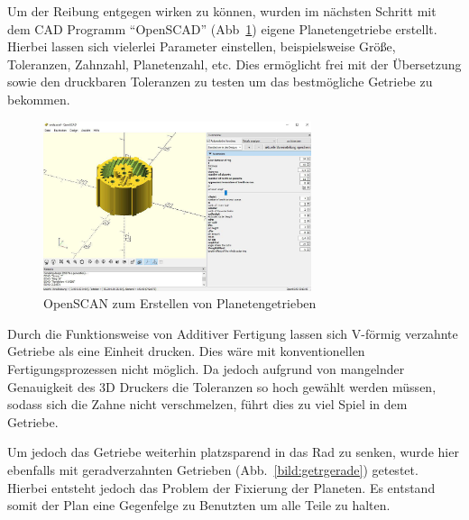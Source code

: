 Um der Reibung entgegen wirken zu können, wurden im nächsten Schritt mit dem CAD Programm ``OpenSCAD'' (Abb~\ref{bild:gearversion2}) eigene Planetengetriebe erstellt.
Hierbei lassen sich vielerlei Parameter einstellen, beispielsweise Größe, Toleranzen, Zahnzahl, Planetenzahl, etc.
Dies ermöglicht frei mit der Übersetzung sowie den druckbaren Toleranzen zu testen um das bestmögliche Getriebe zu bekommen.
\begin{figure}[H]
	\centering
	\includegraphics[width=0.7\textwidth]{bilder/GetriebeVersion2.jpg}
	\caption{OpenSCAN zum Erstellen von Planetengetrieben}
	\label{bild:gearversion2}
\end{figure}

Durch die Funktionsweise von Additiver Fertigung lassen sich V-förmig verzahnte Getriebe als eine Einheit drucken.
Dies wäre mit konventionellen Fertigungsprozessen nicht möglich.
Da jedoch aufgrund von mangelnder Genauigkeit des 3D Druckers die Toleranzen so hoch gewählt werden müssen, 
sodass sich die Zahne nicht verschmelzen, führt dies zu viel Spiel in dem Getriebe.

Um jedoch das Getriebe weiterhin platzsparend in das Rad zu senken, wurde hier ebenfalls mit geradverzahnten Getrieben (Abb.~\ref{bild:getrgerade}) getestet.
Hierbei entsteht jedoch das Problem der Fixierung der Planeten. Es entstand somit der Plan eine Gegenfelge zu Benutzten um alle Teile zu halten.

